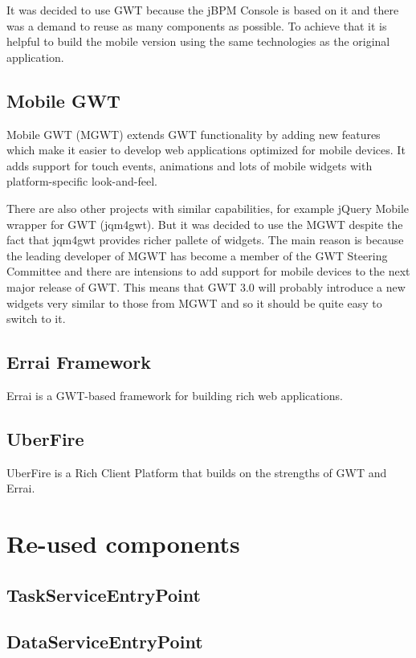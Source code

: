 \documentclass[12pt,oneside,final]{fithesis2}
\begin{document}
It was decided to use GWT because the jBPM Console is based on it and there was a demand to reuse as many components as possible.
To achieve that it is helpful to build the mobile version using the same technologies as the original application.

\subsection{Mobile GWT}
Mobile GWT (MGWT) extends GWT functionality by adding new features which make it easier to develop web applications optimized for mobile devices.
It adds support for touch events, animations and lots of mobile widgets with platform-specific look-and-feel.

There are also other projects with similar capabilities, for example jQuery Mobile wrapper for GWT\footnotemark{} (jqm4gwt).
But it was decided to use the MGWT despite the fact that jqm4gwt provides richer pallete of widgets.
The main reason is because the leading developer of MGWT has become a member of the GWT Steering Committee and there are intensions to add support for mobile devices to the next major release of GWT. \cite{gwtroadmap}
This means that GWT 3.0 will probably introduce a new widgets very similar to those from MGWT and so it should be quite easy to switch to it.

\subsection{Errai Framework}
Errai is a GWT-based framework for building rich web applications. \cite{erraidoc}

\subsection{UberFire}
UberFire is a Rich Client Platform that builds on the strengths of GWT and Errai. \cite{uberfire}

\section{Re-used components}
\subsection{TaskServiceEntryPoint}
\subsection{DataServiceEntryPoint}
\end{document}
